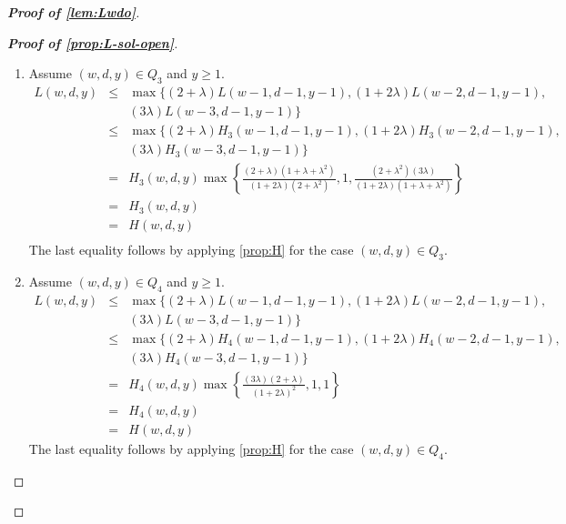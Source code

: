 \documentclass[10pt,a4paper]{article}
\newcommand{\openinteger}{y}
\begin{document}
\begin{proof}[\textbf{Proof of \cref{lem:Lwdo}}]
\begin{proof}[\textbf{Proof of \cref{prop:L-sol-open}}]
\begin{enumerate}[label=\textbf{Case \arabic*:}, itemindent=*, leftmargin=0em]
\item Assume $(w, d, \openinteger)\in Q_3$ and $\openinteger \ge 1$.
\begin{eqnarray*}
L(w, d, \openinteger) & \leq & \max\{(2+\lambda)L(w-1, d-1, \openinteger-1), (1+2\lambda)L(w-2, d-1, \openinteger-1), \\
& & (3\lambda)L(w-3, d-1, \openinteger-1)\}\\
& \le & \max\{(2+\lambda)H_3(w-1, d-1, \openinteger-1), (1+2\lambda)H_3(w-2, d-1, \openinteger-1), \\
& & (3\lambda)H_3(w-3, d-1, \openinteger-1)\}\\
& = & H_3(w, d, \openinteger)\max\left\{\frac{(2+\lambda)(1+\lambda+\lambda^2)}{(1+2\lambda)(2+\lambda^2)}, 1, \frac{(2+\lambda^2)(3\lambda)}{(1+2\lambda)(1+\lambda+\lambda^2)} \right\}\\
& = & H_3(w, d, \openinteger)\\
& = & H(w, d, \openinteger)\\
\end{eqnarray*}
The last equality follows by applying \cref{prop:H} for the case $(w, d,\openinteger)\in Q_3$.

\item Assume $(w, d, \openinteger)\in Q_4$ and $\openinteger \ge 1$.
\begin{eqnarray*}
L(w, d, \openinteger) & \leq & \max\{(2+\lambda)L(w-1, d-1, \openinteger-1), (1+2\lambda)L(w-2, d-1, \openinteger-1), \\
& & (3\lambda)L(w-3, d-1, \openinteger-1)\}\\
& \le & \max\{(2+\lambda)H_4(w-1, d-1, \openinteger-1), (1+2\lambda)H_4(w-2, d-1, \openinteger-1), \\
& & (3\lambda)H_4(w-3, d-1, \openinteger-1)\}\\
& = & H_4(w, d, \openinteger)\max\left\{\frac{(3\lambda)(2+\lambda)}{(1+2\lambda)^2}, 1, 1 \right\}\\
& = & H_4(w, d, \openinteger)\\
& = & H(w, d, \openinteger)
\end{eqnarray*}
The last equality follows by applying \cref{prop:H} for the case $(w, d,\openinteger)\in Q_4$.


\end{enumerate}
\end{proof}
\end{proof}
\end{document}
